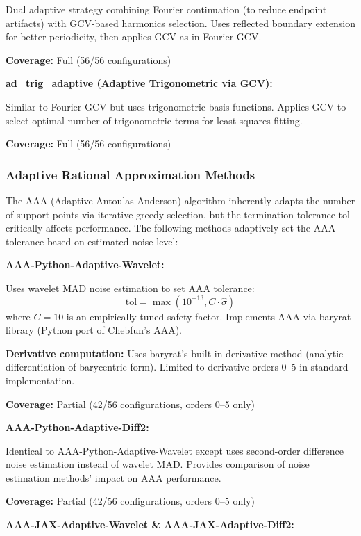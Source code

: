 Dual adaptive strategy combining Fourier continuation (to reduce endpoint artifacts) with GCV-based harmonics selection. Uses reflected boundary extension for better periodicity, then applies GCV as in Fourier-GCV.

\textbf{Coverage:} Full (56/56 configurations)

\textbf{ad\_trig\_adaptive (Adaptive Trigonometric via GCV):}

Similar to Fourier-GCV but uses trigonometric basis functions. Applies GCV to select optimal number of trigonometric terms for least-squares fitting.

\textbf{Coverage:} Full (56/56 configurations)

\subsubsection{Adaptive Rational Approximation Methods}

The AAA (Adaptive Antoulas-Anderson) algorithm inherently adapts the number of support points via iterative greedy selection, but the termination tolerance $\text{tol}$ critically affects performance. The following methods adaptively set the AAA tolerance based on estimated noise level:

\textbf{AAA-Python-Adaptive-Wavelet:}

Uses wavelet MAD noise estimation to set AAA tolerance:
\begin{equation}
\text{tol} = \max(10^{-13}, C \cdot \hat{\sigma})
\end{equation}
where $C = 10$ is an empirically tuned safety factor. Implements AAA via baryrat library (Python port of Chebfun's AAA).

\textbf{Derivative computation:} Uses baryrat's built-in derivative method (analytic differentiation of barycentric form). Limited to derivative orders 0--5 in standard implementation.

\textbf{Coverage:} Partial (42/56 configurations, orders 0--5 only)

\textbf{AAA-Python-Adaptive-Diff2:}

Identical to AAA-Python-Adaptive-Wavelet except uses second-order difference noise estimation instead of wavelet MAD. Provides comparison of noise estimation methods' impact on AAA performance.

\textbf{Coverage:} Partial (42/56 configurations, orders 0--5 only)

\textbf{AAA-JAX-Adaptive-Wavelet \& AAA-JAX-Adaptive-Diff2:}

